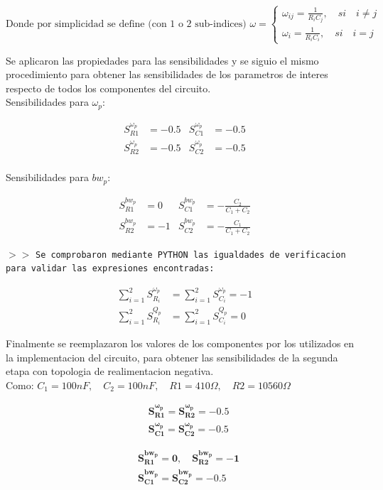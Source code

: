 $$
\text{Donde por simplicidad se define (con 1 o 2 sub-indices) }
\omega=\begin{cases}
            \omega_{ij}=\frac{1}{R_{i} C_{j}}, \quad si \quad i\neq j \\
            \omega_{i}=\frac{1}{R_{i} C_{i}}, \quad si\quad i=j
        \end{cases}
$$

Se aplicaron las propiedades para las sensibilidades y se siguio el mismo procedimiento para obtener las sensibilidades de los parametros de interes respecto de todos los componentes del circuito. \\

Sensibilidades para $\omega_{p}$:

\begin{align*}
    S^{\omega_{p}}_{R1} &= - 0.5  &
    S^{\omega_{p}}_{C1} &= - 0.5 \\
    S^{\omega_{p}}_{R2} &= - 0.5  &
    S^{\omega_{p}}_{C2} &= - 0.5 \\
\end{align*}

Sensibilidades para $bw_{p}$:

\begin{align*}
    S^{bw_p}_{R1} &= 0  &
    S^{bw_p}_{C1} &= - \frac{C_{2}}{C_{1} + C_{2}} \\
    S^{bw_p}_{R2} &= - 1  &
    S^{bw_p}_{C2} &= - \frac{C_{1}}{C_{1} + C_{2}}
\end{align*}

\noindent $>>$ \texttt{Se comprobaron mediante PYTHON las igualdades de verificacion para validar las expresiones encontradas:}

\begin{align*}
    \sum_{i=1}^{2} S^{\omega_p}_{R_i} &= \sum_{i=1}^{2} S^{\omega_p}_{C_i} = -1 \\
    \sum_{i=1}^{2} S^{Q_p}_{R_i} &= \sum_{i=1}^{2} S^{Q_p}_{C_i} = 0
\end{align*}

Finalmente se reemplazaron los valores de los componentes por los utilizados en la implementacion del circuito, para obtener las sensibilidades de la segunda etapa con topologia de realimentacion negativa. \\

Como: $C_{1}=100 nF, \quad C_{2}=100 nF, \quad R1=410 \Omega, \quad R2=10560 \Omega$ 
    
\begin{align}
    &\mathbf{S^{\omega_{p}}_{R1} = S^{\omega_{p}}_{R2} = -0.5} \\
    &\mathbf{S^{\omega_{p}}_{C1} = S^{\omega_{p}}_{C2} = -0.5}
\end{align}

\begin{align}
    &\mathbf{S^{bw_{p}}_{R1} = 0, \quad S^{bw_{p}}_{R2} = -1} \\
    &\mathbf{S^{bw_{p}}_{C1} = S^{bw_{p}}_{C2} = -0.5}
\end{align}